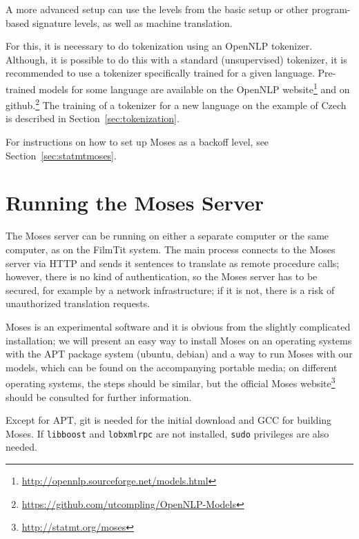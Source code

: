 A more advanced setup can use the levels from the basic setup or other program-based signature levels, as well as machine translation. 

For this, it is necessary to do tokenization using an OpenNLP tokenizer. Although, it is possible to do this with a standard (unsupervised) tokenizer, it is recommended to use a tokenizer specifically trained for a given language. Pre-trained models for some language are available on the OpenNLP website\footnote{\url{http://opennlp.sourceforge.net/models.html}} and on github.\footnote{\url{https://github.com/utcompling/OpenNLP-Models}} The training of a tokenizer for a new language on the example of Czech is described in Section~\ref{sec:tokenization}. 

For instructions on how to set up Moses as a backoff level, see Section~\ref{sec:statmtmoses}.

\section{Running the Moses Server}
\label{sec:installAndRunMoses}

The Moses server can be running on either a separate computer or the same computer, as on the FilmTit system. The main process connects to the Moses server via HTTP and sends it sentences to translate as remote procedure calls; however, there is no kind of authentication, so the Moses server has to be secured, for example by a network infrastructure; if it is not, there is a risk of unauthorized translation requests.

Moses is an experimental software and it is obvious from the slightly complicated installation; we will present an easy way to install Moses on an operating systems with the APT package system (ubuntu, debian) and a way to run Moses with our models, which can be found on the accompanying portable media; on different operating systems, the steps should be similar, but the official Moses website\footnote{\url{http://statmt.org/moses}} should be consulted for further information.

Except for APT, git is needed for the initial download and GCC for building Moses. If \texttt{libboost} and \texttt{lobxmlrpc} are not installed, \texttt{sudo} privileges are also needed.

